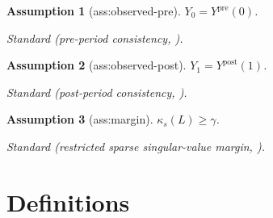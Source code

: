 \documentclass{article}
\newtheorem{assumption}{Assumption}
\begin{document}
\begin{assumption}[ass:observed-pre]\label{ass:observed-pre}
\(Y_0=Y^{\mathrm{pre}}(0)\).
\par\smallskip\noindent\emph{Standard} (pre-period consistency, \cite{HeLiShiMiao2026}).
\end{assumption}

\begin{assumption}[ass:observed-post]\label{ass:observed-post}
\(Y_1=Y^{\mathrm{post}}(1)\).
\par\smallskip\noindent\emph{Standard} (post-period consistency, \cite{HeLiShiMiao2026}).
\end{assumption}

\begin{assumption}[ass:margin]\label{ass:margin}
\(\kappa_s(L)\ge\gamma\).
\par\smallskip\noindent\emph{Standard} (restricted sparse singular-value margin, \cite{NicklVanDeGeer2013}).
\end{assumption}

\section{Definitions}
\end{document}
